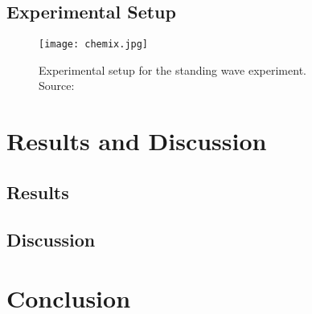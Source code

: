 \documentclass[12pt, a4paper, english]{article}
\begin{document}
\subsection{Experimental Setup}
\begin{figure}[H]
    \centering
    \texttt{[image: chemix.jpg]}
    \caption{Experimental setup for the standing wave experiment. \\ Source: \cite{chemix}}
    \label{fig:setup}
\end{figure}
\section{Results and Discussion}
\subsection{Results}

\subsection{Discussion}

\section{Conclusion}

\pagebreak
\printbibliography %
\end{document}
